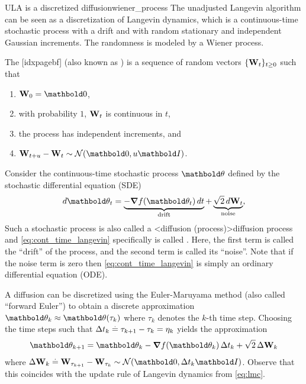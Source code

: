 \begin{rmk}{ULA is a discretized diffusion}{wiener_process}
  The unadjusted Langevin algorithm can be seen as a discretization of Langevin dynamics, which is a continuous-time stochastic process with a drift and with random stationary and independent Gaussian increments.
  The randomness is modeled by a Wiener process.

  \begin{defn}
    The [idxpagebf] (also known as ) is a sequence of random vectors $\{\mathbf{W}_t\}_{t \geq 0}$ such that \begin{enumerate}
      \item $\rW_0 = \vzero$,
      \item with probability $1$, $\mathbf{W}_t$ is continuous in $t$,
      \item the process has independent increments, and
      \item $\rW_{t+u} - \rW_t \sim \N{\vzero}{u \mI}$.
    \end{enumerate}
  \end{defn}

  Consider the continuous-time stochastic process $\vtheta$ defined by the stochastic differential equation (SDE) \begin{align}
    d \vtheta_t = \underbrace{- \grad f(\vtheta_t) \,d t}_{\text{drift}} + \underbrace{\sqrt{2} \,d \rW_t}_{\text{noise}}, \label{eq:cont_time_langevin}
  \end{align}
  Such a stochastic process is also called a \midx<diffusion (process)>{diffusion process} and \cref{eq:cont_time_langevin} specifically is called .
  Here, the first term is called the ``drift'' of the process, and the second term is called its ``noise''.
  Note that if the noise term is zero then \cref{eq:cont_time_langevin} is simply an ordinary differential equation (ODE).

  A diffusion can be discretized using the Euler-Maruyama method (also called ``forward Euler'') to obtain a discrete approximation $\vtheta_k \approx \vtheta(\tau_k)$ where $\tau_k$ denotes the $k$-th time step.
  Choosing the time steps such that $\Delta t_k \overset{.}{=} \tau_{k+1} - \tau_{k} = \eta_k$ yields the approximation \begin{align}
    \vtheta_{k+1} = \vtheta_k - \grad f(\vtheta_k) \,\Delta t_k + \sqrt{2} \,\Delta \rW_k
  \end{align} where $\Delta \rW_k \defeq \rW_{\tau_{k+1}} - \rW_{\tau_k} \sim \N{\vzero}{\Delta t_k \mI}$.
  Observe that this coincides with the update rule of Langevin dynamics from \cref{eq:lmc}.
\end{rmk}

